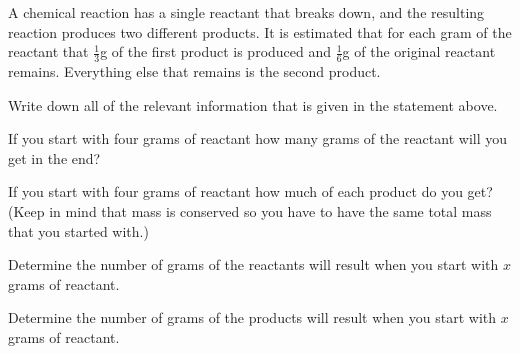 
\begin{problem}
\item A chemical reaction has a single reactant that breaks down, 
  and the resulting reaction produces two different
  products. It is estimated that for each gram of the reactant that
  $\frac{1}{3}$g of the first product is produced and $\frac{1}{6}$g
  of the original reactant remains. Everything else that remains is
  the second product.
  \begin{subproblem}
  \item Write down all of the relevant information that is given in the
    statement above.
    \vfill
  \item If you start with four grams of reactant how many grams of the
    reactant will you get in the end?
    \vfill
  \item If you start with four grams of reactant how much of each
    product do you get?  (Keep in mind that mass is
    conserved so you have to have the same total mass that you started
    with.)
    \vfill
  \item Determine the number of grams of the reactants will result
    when you start with $x$ grams of reactant.
    \vfill
  \item Determine the number of grams of the products will result when
    you start with $x$ grams of reactant.
    \vfill
  \end{subproblem}
\end{problem}



